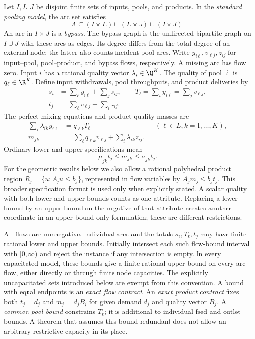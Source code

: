 Let $I,L,J$ be disjoint finite sets of inputs, pools, and products.
In the \emph{standard pooling model}, the arc set satisfies
\[
 A\subseteq(I\times L)\cup(L\times J)\cup(I\times J).
\]
An arc in $I\times J$ is a \emph{bypass}. The bypass graph is the
undirected bipartite graph on $I\cup J$ with these arcs as edges.
Its degree differs from the total degree of an external node: the latter
also counts incident pool arcs. Write $y_{i\ell},v_{\ell j},z_{ij}$ for
input--pool, pool--product, and bypass flows, respectively. A missing arc
has flow zero. Input $i$ has a rational quality vector
$\lambda_i\in\Q^K$. The quality of pool $\ell$ is $q_\ell\in\R^K$.
Define input withdrawals, pool throughputs, and product deliveries by
\begin{align}
 s_i&=\sum_\ell y_{i\ell}+\sum_jz_{ij},\qquad
 T_\ell=\sum_i y_{i\ell}=\sum_jv_{\ell j},\label{s1:mass}\\
 t_j&=\sum_\ell v_{\ell j}+\sum_i z_{ij}.
\end{align}
The perfect-mixing equations and product quality masses are
\begin{align}
 \sum_i\lambda_{ik}y_{i\ell}&=q_{\ell k}T_\ell
       &&(\ell\in L, k=1,\ldots,K),\label{s1:mixing}\\
 m_{jk}&=\sum_\ell q_{\ell k}v_{\ell j}
                +\sum_i\lambda_{ik}z_{ij}.
\end{align}
Ordinary lower and upper specifications mean
\begin{equation}
 \underline\mu_{jk}t_j\le m_{jk}\le\overline\mu_{jk}t_j.
 \label{s1:quality}
\end{equation}
For the geometric results below we also allow a rational polyhedral
product region $R_j=\{u:A_ju\le b_j\}$, represented in flow variables by
$A_jm_j\le b_jt_j$. This broader specification format is used only when
explicitly stated. A scalar quality with both lower and upper bounds
counts as one attribute. Replacing a lower bound by an upper bound on the
negative of that attribute creates another coordinate in an
upper-bound-only formulation; these are different restrictions.

All flows are nonnegative. Individual arcs and the totals $s_i,T_\ell,t_j$
may have finite rational lower and upper bounds. Initially intersect
each such flow-bound interval with $[0,\infty)$ and reject the instance
if any intersection is empty. In every capacitated
model, these bounds give a finite rational upper bound on every arc flow,
either directly or through finite node capacities. The explicitly
uncapacitated sets introduced below are exempt from this convention.
A bound with equal
endpoints is an \emph{exact flow contract}. An \emph{exact product
contract} fixes both $t_j=d_j$ and $m_j=d_jB_j$ for given demand $d_j$
and quality vector $B_j$. A \emph{common pool bound} constrains $T_\ell$;
it is additional to individual feed and outlet bounds. A theorem that
assumes this bound redundant does not allow an arbitrary restrictive
capacity in its place.

